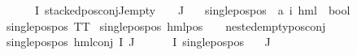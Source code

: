 \begin{isabellebody}
\ {\isachardoublequoteopen}{\isasymforall}{\isasymphi}\ {\isasymin}\ {\isacharparenleft}{\kern0pt}{\isasymPhi}\ {\isacharbackquote}{\kern0pt}\ I{\isacharparenright}{\kern0pt}{\isachardot}{\kern0pt}\ {\isacharparenleft}{\kern0pt}stacked{\isacharunderscore}{\kern0pt}pos{\isacharunderscore}{\kern0pt}conj{\isacharunderscore}{\kern0pt}J{\isacharunderscore}{\kern0pt}empty\ {\isasymphi}{\isacharparenright}{\kern0pt}{\isachardoublequoteclose}\ {\isachardoublequoteopen}{\isasymPhi}\ {\isacharbackquote}{\kern0pt}\ J\ {\isacharequal}{\kern0pt}\ {\isacharbraceleft}{\kern0pt}{\isacharbraceright}{\kern0pt}{\isachardoublequoteclose}\isanewline
\isanewline
{}\isamarkupfalse%
\ single{\isacharunderscore}{\kern0pt}pos{\isacharunderscore}{\kern0pt}pos\ {\isacharcolon}{\kern0pt}{\isacharcolon}{\kern0pt}\ {\isachardoublequoteopen}{\isacharparenleft}{\kern0pt}{\isacharprime}{\kern0pt}a{\isacharcomma}{\kern0pt}\ {\isacharprime}{\kern0pt}i{\isacharparenright}{\kern0pt}\ hml\ {\isasymRightarrow}\ bool{\isachardoublequoteclose}\isanewline
\ \ \isanewline
{\isachardoublequoteopen}single{\isacharunderscore}{\kern0pt}pos{\isacharunderscore}{\kern0pt}pos\ TT{\isachardoublequoteclose}\ {\isacharbar}{\kern0pt}\isanewline
{\isachardoublequoteopen}single{\isacharunderscore}{\kern0pt}pos{\isacharunderscore}{\kern0pt}pos\ {\isacharparenleft}{\kern0pt}hml{\isacharunderscore}{\kern0pt}pos\ {\isacharunderscore}{\kern0pt}\ {\isasympsi}{\isacharparenright}{\kern0pt}{\isachardoublequoteclose}\ \ {\isachardoublequoteopen}nested{\isacharunderscore}{\kern0pt}empty{\isacharunderscore}{\kern0pt}pos{\isacharunderscore}{\kern0pt}conj\ {\isasympsi}{\isachardoublequoteclose}\ {\isacharbar}{\kern0pt}\isanewline
{\isachardoublequoteopen}single{\isacharunderscore}{\kern0pt}pos{\isacharunderscore}{\kern0pt}pos\ {\isacharparenleft}{\kern0pt}hml{\isacharunderscore}{\kern0pt}conj\ I\ J\ {\isasymPhi}{\isacharparenright}{\kern0pt}{\isachardoublequoteclose}\ \ \isanewline
{\isachardoublequoteopen}{\isacharparenleft}{\kern0pt}{\isasymforall}{\isasymphi}\ {\isasymin}\ {\isacharparenleft}{\kern0pt}{\isasymPhi}\ {\isacharbackquote}{\kern0pt}I{\isacharparenright}{\kern0pt}{\isachardot}{\kern0pt}\ {\isacharparenleft}{\kern0pt}single{\isacharunderscore}{\kern0pt}pos{\isacharunderscore}{\kern0pt}pos\ {\isasymphi}{\isacharparenright}{\kern0pt}{\isacharparenright}{\kern0pt}{\isachardoublequoteclose}\isanewline
{\isachardoublequoteopen}{\isacharparenleft}{\kern0pt}{\isasymPhi}\ {\isacharbackquote}{\kern0pt}\ J{\isacharparenright}{\kern0pt}\ {\isacharequal}{\kern0pt}\ {\isacharbraceleft}{\kern0pt}{\isacharbraceright}{\kern0pt}{\isachardoublequoteclose}\isanewline

\end{isabellebody}
